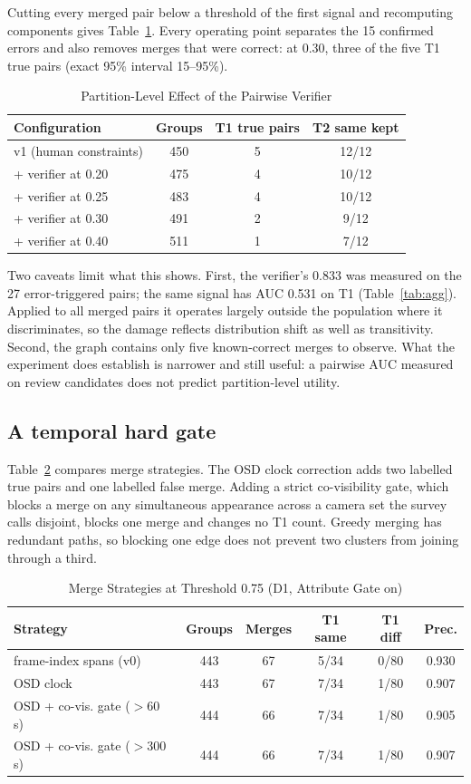 \documentclass[journal]{IEEEtran}
\begin{document}
Cutting every merged pair below a threshold of the first signal and recomputing components gives Table~\ref{tab:verifier}. Every operating point separates the 15 confirmed errors and also removes merges that were correct: at 0.30, three of the five T1 true pairs (exact 95\% interval 15--95\%).

\begin{table}[t]
\caption{Partition-Level Effect of the Pairwise Verifier}\label{tab:verifier}
\centering
\begin{tabular}{@{}lccc@{}}
\toprule
Configuration & Groups & T1 true pairs & T2 same kept\\
\midrule
v1 (human constraints) & 450 & 5 & 12/12\\
+ verifier at 0.20 & 475 & 4 & 10/12\\
+ verifier at 0.25 & 483 & 4 & 10/12\\
+ verifier at 0.30 & 491 & 2 & 9/12\\
+ verifier at 0.40 & 511 & 1 & 7/12\\
\bottomrule
\end{tabular}
\end{table}

Two caveats limit what this shows. First, the verifier's 0.833 was measured on the 27 error-triggered pairs; the same signal has AUC 0.531 on T1 (Table~\ref{tab:agg}). Applied to all merged pairs it operates largely outside the population where it discriminates, so the damage reflects distribution shift as well as transitivity. Second, the graph contains only five known-correct merges to observe. What the experiment does establish is narrower and still useful: a pairwise AUC measured on review candidates does not predict partition-level utility.

\subsection{A temporal hard gate}
Table~\ref{tab:merge} compares merge strategies. The OSD clock correction adds two labelled true pairs and one labelled false merge. Adding a strict co-visibility gate, which blocks a merge on any simultaneous appearance across a camera set the survey calls disjoint, blocks one merge and changes no T1 count. Greedy merging has redundant paths, so blocking one edge does not prevent two clusters from joining through a third.

\begin{table}[t]
\caption{Merge Strategies at Threshold 0.75 (D1, Attribute Gate on)}\label{tab:merge}
\centering
\setlength{\tabcolsep}{3.5pt}
\begin{tabular}{@{}lccccc@{}}
\toprule
Strategy & Groups & Merges & T1 same & T1 diff & Prec.\\
\midrule
frame-index spans (v0) & 443 & 67 & 5/34 & 0/80 & 0.930\\
OSD clock & 443 & 67 & 7/34 & 1/80 & 0.907\\
OSD + co-vis. gate ($>$60 s) & 444 & 66 & 7/34 & 1/80 & 0.905\\
OSD + co-vis. gate ($>$300 s) & 444 & 66 & 7/34 & 1/80 & 0.907\\
\bottomrule
\end{tabular}
\end{table}
\end{document}
